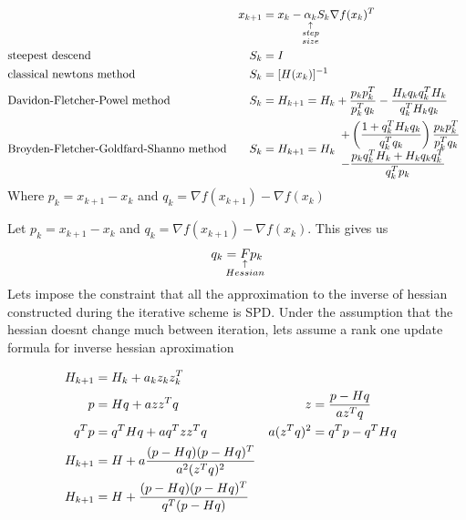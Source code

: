 \begin{slide}
	\begin{align*}
		&&x_{k+1} &= x_{k} - \explain{\alpha_k}{step\\size}S_k\nabla f(x_k)^T
		\\
		&\text{steepest descend}&
		S_k &= I 
		\\
		&\text{classical newtons method}&
		S_k &= [H(x_k)]^{-1}
		\\
		&\text{Davidon-Fletcher-Powel method}&
		S_k &= H_{k+1} = H_k + {p_kp_k^T\over p_k^Tq_k} -{H_kq_kq_k^TH_k \over q_k^TH_kq_k}
		\\
		&\text{Broyden-Fletcher-Goldfard-Shanno method}&
		S_k &= H_{k+1} = H_k 
			\begin{array}{l}
				\displaystyle 
				+ \left({1+q_k^TH_kq_k\over q_k^Tq_k}\right){p_kp_k^T\over p_k^Tq_k}
				\\
				\displaystyle 
				-{p_kq_k^TH_k+H_kq_kq_k^T \over q_k^Tp_k}
			\end{array}
	\end{align*}
Where $p_k = x_{k+1} - x_k$ and $q_k = \nabla f(x_{k+1}) - \nabla f(x_k)$
\end{slide}
\begin{slide}
	Let $p_k = x_{k+1} - x_k$ and $q_k = \nabla f(x_{k+1}) - \nabla f(x_k)$. This gives us
	\begin{align}
		q_k = \explain{F}{Hessian}p_k\label{eqn:dfp1}
	\end{align}
	Lets impose the constraint that all the approximation to the inverse of hessian constructed during the iterative scheme is  SPD. Under the assumption that the hessian doesnt change much between iteration, lets assume a rank one update formula for inverse hessian aproximation
	
	\begin{align}
	H_{k+1} &= H_k + a_kz_kz_k^T\label{eqn:dfp2} 
	\\
	p  &= Hq+azz^Tq    & z&= {p - Hq \over az^Tq}
	\\
	q^Tp  &= q^THq+aq^Tzz^Tq &  a(z^Tq)^2 &=q^Tp -q^T Hq
	\\
	H_{k+1} &= H+ a {(p-Hq)(p-Hq)^T\over a^2(z^T q)^2} 
	\\
	H_{k+1}&= H + {(p-Hq)(p-Hq)^T \over q^T(p-Hq)}
	\end{align}
\end{slide}
